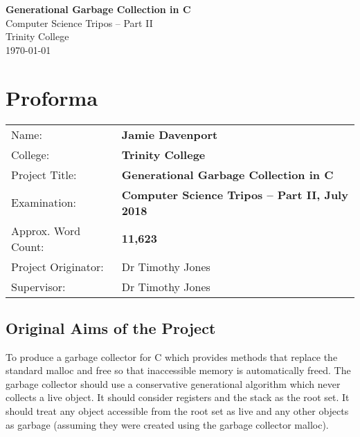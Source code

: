 \documentclass[12pt,a4paper,twoside,openright]{report}
\begin{document}





\pagestyle{empty}


\vspace*{60mm}
\begin{center}
\LARGE
\textbf{Generational Garbage Collection in C} \\[5mm]
Computer Science Tripos -- Part II \\[5mm]
Trinity College \\[5mm]
\today  %
\end{center}


\pagestyle{plain}

\chapter*{Proforma}

{\large
\begin{tabular}{ll}
Name:               & \bf Jamie Davenport                       \\
College:            & \bf Trinity College                     \\
Project Title:      & \bf Generational Garbage Collection in C \\
Examination:        & \bf Computer Science Tripos -- Part II, July 2018  \\
Approx. Word Count:         & \bf 11,623  \\
Project Originator: & Dr Timothy Jones                    \\
Supervisor:         & Dr Timothy Jones                    \\ 
\end{tabular}
}


\section*{Original Aims of the Project}

To produce a garbage collector for C which provides methods that replace the standard malloc and free so that inaccessible memory is automatically freed. The garbage collector should use a conservative generational algorithm which never collects a live object. It should consider registers and the stack as the root set. It should treat any object accessible from the root set as live and any other objects as garbage (assuming they were created using the garbage collector malloc).
\end{document}
